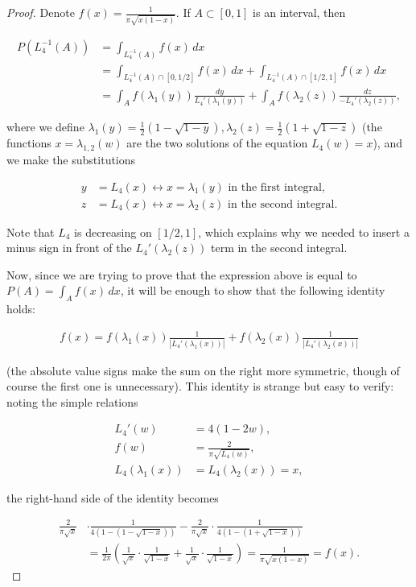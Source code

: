 \documentclass[11pt]{report}
\theoremstyle{plain}
\theoremstyle{definition}
\begin{document}
\begin{proof}
Denote $f(x)=\frac{1}{\pi \sqrt{x(1-x)}}$. If
$A \subset [0,1]$ is an interval, then

\begin{align*}
P(L_4^{-1}(A)) &= \int_{L_4^{-1}(A)} f(x)\,dx \\ &=
\int_{L_4^{-1}(A)\cap\left[0,1/2\right]} f(x)\,dx +
\int_{L_4^{-1}(A)\cap\left[1/2,1\right]} f(x)\,dx \\
&= \int_A f(\lambda_1(y))\frac{dy}{L_4'(\lambda_1(y))} + \int_A f(\lambda_2(z)) \frac{dz}{-L_4'(\lambda_2(z))},
\end{align*}

where we define
$\lambda_1(y)=\tfrac12(1-\sqrt{1-y}),
\lambda_2(z)=\tfrac12(1+\sqrt{1-z})$
(the functions $x=\lambda_{1,2}(w)$ are the two
solutions of the equation $L_4(w)=x$), and we make
the substitutions

\begin{align*}
y&=L_4(x) \leftrightarrow x=\lambda_1(y) \textrm{ in the first integral,} \\ z&=L_4(x) \leftrightarrow x=\lambda_2(z) \textrm{ in the second integral}.
\end{align*}

Note that $L_4$ is decreasing on $[1/2,1]$, which
explains why we needed to insert a minus sign in front
of the $L_4'(\lambda_2(z))$ term in the second
integral.

Now, since we are trying to prove that the expression
above is equal to $P(A)=\int_A f(x)\,dx$, it will be
enough to show that the following identity holds:

\begin{align*}
f(x) = f(\lambda_1(x))\frac{1}{|L_4'(\lambda_1(x))|} + f(\lambda_2(x))\frac{1}{|L_4'(\lambda_2(x))|}
\end{align*}

(the absolute value signs make the sum on the right
more symmetric, though of course the first one is
unnecessary). This identity is strange but easy to
verify: noting the simple relations

\begin{align*}
L_4'(w) &=4(1-2w), \\ f(w)&=\frac{2}{\pi\sqrt{L_4(w)}}, \\ L_4(\lambda_1(x)) &= L_4(\lambda_2(x)) =x,
\end{align*}

the right-hand side of the identity becomes

\begin{align*}
\frac{2}{\pi \sqrt{x}} &\cdot \frac{1}{4(1-(1-\sqrt{1-x}))}
-
\frac{2}{\pi \sqrt{x}}\cdot \frac{1}{4(1-(1+\sqrt{1-x}))} \\
& =
\frac{1}{2\pi} \left( \frac{1}{\sqrt{x}}\cdot \frac{1}{\sqrt{1-x}} +
\frac{1}{\sqrt{x}}\cdot \frac{1}{\sqrt{1-x}} \right) = \frac{1}{\pi\sqrt{x(1-x)}} = f(x).
\end{align*}

\end{proof}
\end{document}
